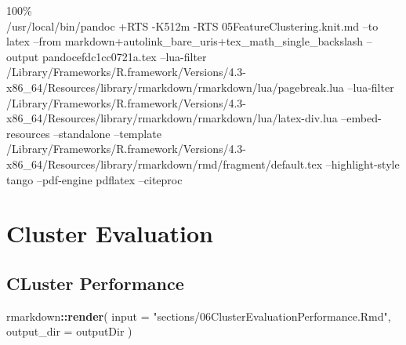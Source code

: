 \documentclass[
]{article}
\newenvironment{Shaded}{\begin{snugshade}}{\end{snugshade}}
\newcommand{\AttributeTok}[1]{\textcolor[rgb]{0.13,0.29,0.53}{#1}}
\newcommand{\FunctionTok}[1]{\textcolor[rgb]{0.13,0.29,0.53}{\textbf{#1}}}
\newcommand{\NormalTok}[1]{#1}
\newcommand{\SpecialCharTok}[1]{\textcolor[rgb]{0.81,0.36,0.00}{\textbf{#1}}}
\newcommand{\StringTok}[1]{\textcolor[rgb]{0.31,0.60,0.02}{#1}}
\begin{document}
100\%\\
/usr/local/bin/pandoc +RTS -K512m -RTS 05FeatureClustering.knit.md --to
latex --from markdown+autolink\_bare\_uris+tex\_math\_single\_backslash
--output pandocefdc1cc0721a.tex --lua-filter
/Library/Frameworks/R.framework/Versions/4.3-x86\_64/Resources/library/rmarkdown/rmarkdown/lua/pagebreak.lua
--lua-filter
/Library/Frameworks/R.framework/Versions/4.3-x86\_64/Resources/library/rmarkdown/rmarkdown/lua/latex-div.lua
--embed-resources --standalone --template
/Library/Frameworks/R.framework/Versions/4.3-x86\_64/Resources/library/rmarkdown/rmd/fragment/default.tex
--highlight-style tango --pdf-engine pdflatex --citeproc

\hypertarget{cluster-evaluation}{%
\section{Cluster Evaluation}\label{cluster-evaluation}}

\hypertarget{cluster-performance}{%
\subsection{CLuster Performance}\label{cluster-performance}}

\begin{Shaded}
\begin{Highlighting}[]
\NormalTok{rmarkdown}\SpecialCharTok{::}\FunctionTok{render}\NormalTok{(}
  \AttributeTok{input =} \StringTok{"sections/06ClusterEvaluationPerformance.Rmd"}\NormalTok{,}
  \AttributeTok{output\_dir =}\NormalTok{ outputDir}
\NormalTok{)}
\end{Highlighting}
\end{Shaded}
\end{document}
